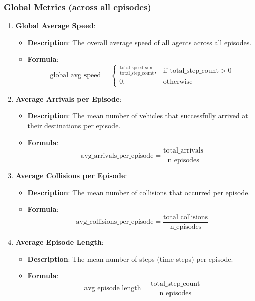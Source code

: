\subsubsection*{Global Metrics (across all episodes)}

\begin{enumerate}
    \item \textbf{Global Average Speed}:
    \begin{itemize}
        \item \textbf{Description}: The overall average speed of all agents across all episodes.
        \item \textbf{Formula}:
        \[
        \text{global\_avg\_speed} =
        \begin{cases}
        \frac{\text{total\_speed\_sum}}{\text{total\_step\_count}}, & \text{if } \text{total\_step\_count} > 0 \\
        0, & \text{otherwise}
        \end{cases}
        \]
    \end{itemize}
    
    \item \textbf{Average Arrivals per Episode}:
    \begin{itemize}
        \item \textbf{Description}: The mean number of vehicles that successfully arrived at their destinations per episode.
        \item \textbf{Formula}:
        \[
        \text{avg\_arrivals\_per\_episode} = \frac{\text{total\_arrivals}}{\text{n\_episodes}}
        \]
    \end{itemize}
    
    \item \textbf{Average Collisions per Episode}:
    \begin{itemize}
        \item \textbf{Description}: The mean number of collisions that occurred per episode.
        \item \textbf{Formula}:
        \[
        \text{avg\_collisions\_per\_episode} = \frac{\text{total\_collisions}}{\text{n\_episodes}}
        \]
    \end{itemize}
    
    \item \textbf{Average Episode Length}:
    \begin{itemize}
        \item \textbf{Description}: The mean number of steps (time steps) per episode.
        \item \textbf{Formula}:
        \[
        \text{avg\_episode\_length} = \frac{\text{total\_step\_count}}{\text{n\_episodes}}
        \]
    \end{itemize}
\end{enumerate}

